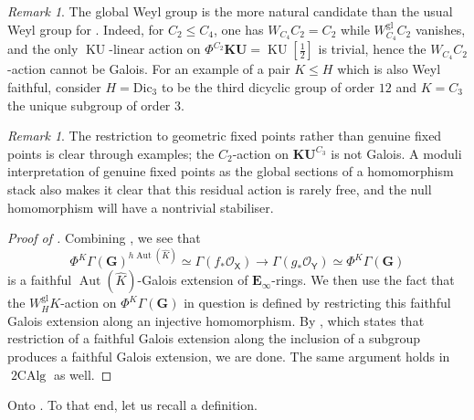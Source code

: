 \documentclass[11pt, a4paper]{article}
\newcommand{\gl}{\mathrm{gl}}
\newcommand{\1}{\mathbf{1}}
\DeclareMathOperator{\KU}{KU}
\newcommand{\gKU}{{\mathbf{KU}}}
\DeclareMathOperator{\tworing}{2CAlg}
\DeclareMathOperator{\Aut}{Aut}
\newcommand{\dual}[1]{{\widehat{#1}}}
\newcommand{\E}{\mathbf{E}}
\newcommand{\G}{\mathbf{G}}
\renewcommand{\O}{\mathcal{O}}
\newcommand{\X}{\mathsf{X}}
\newcommand{\Y}{\mathsf{Y}}
\newcommand{\Z}{\mathbf{Z}}
\newcommand{\Ga}{\Gamma}
\theoremstyle{plain}
\theoremstyle{definition}
\theoremstyle{remark}\numberwithin{equation}{section}
\newtheorem{remark}[equation]{Remark}
\begin{document}
\begin{remark}\label{rmk:global_weyl_better_than_classical}
    The global Weyl group is the more natural candidate than the usual Weyl group for . Indeed, for $C_2 \leq C_4$, one has $W_{C_4} C_2 = C_2$ while $W_{C_4}^\gl C_2$ vanishes, and the only $\KU$-linear action on $\Phi^{C_2} \gKU = \KU[\tfrac{1}{2}]$ is trivial, hence the $W_{C_4} C_2$-action cannot be Galois. For an example of a pair $K\leq H$ which is also Weyl faithful, consider $H=\mathrm{Dic}_3$ to be the third dicyclic group of order $12$ and $K=C_3$ the unique subgroup of order $3$.
\end{remark}

\begin{remark}\label{rmk:geometric_fixed_points_better_than_genuine}
    The restriction to geometric fixed points rather than genuine fixed points is clear through examples; the $C_2$-action on $\gKU^{C_3}$ is not Galois. %
    A moduli interpretation of genuine fixed points as the global sections of a homomorphism stack also makes it clear that this residual action is rarely free, and the null homomorphism will have a nontrivial stabiliser.
\end{remark}

\begin{proof}[Proof of ]
    Combining , we see that
    \[\Phi^K \Ga(\G)^{h\Aut(\dual{K})} \simeq \Ga(f_\ast \O_\X) \to \Ga(g_\ast \O_\Y) \simeq \Phi^K \Ga(\G)\]
    is a faithful $\Aut(\dual{K})$-Galois extension of $\E_\infty$-rings. We then use the fact that the $W_H^\gl K$-action on $\Phi^K \Ga(\G)$ in question is defined by restricting this faithful Galois extension along an injective homomorphism. By \cite[Thm.1.2(a)]{johnrognessdualisinggorups}, which states that restriction of a faithful Galois extension along the inclusion of a subgroup produces a faithful Galois extension, we are done. The same argument holds in $\tworing$ as well.
\end{proof}

Onto . To that end, let us recall a definition.
\end{document}
